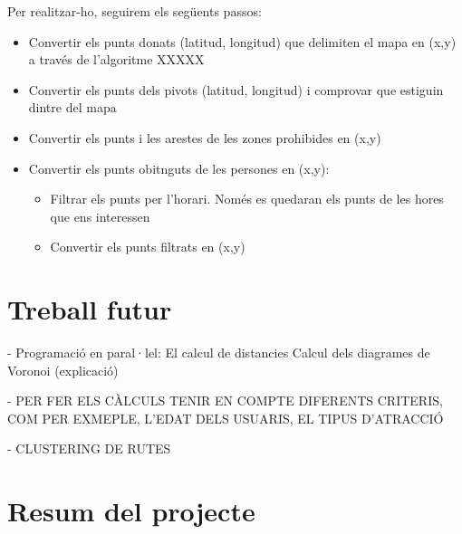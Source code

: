 \documentclass[12pt]{article}
\begin{document}
Per realitzar-ho, seguirem els següents passos:
\begin{itemize}
	\item Convertir els punts donats (latitud, longitud) que delimiten el mapa en (x,y) a través de l'algoritme XXXXX
	\item Convertir els punts dels pivots (latitud, longitud) i comprovar que estiguin dintre del mapa
	\item Convertir els punts i les arestes de les zones prohibides en (x,y)
	\item Convertir els punts obitnguts de les persones en (x,y):
	\begin{itemize}
		\item Filtrar els punts per l'horari. Només es quedaran els punts de les hores que ens interessen
		\item Convertir els punts filtrats en (x,y)
	\end{itemize}
	
\end{itemize}

\clearpage
\section{Treball futur}
- Programació en paral·lel:
	El calcul de distancies
	Calcul dels diagrames de Voronoi (explicació)

- PER FER ELS CÀLCULS TENIR EN COMPTE DIFERENTS CRITERIS, COM PER EXMEPLE, L'EDAT DELS USUARIS, EL TIPUS D'ATRACCIÓ

- CLUSTERING DE RUTES

\clearpage
\section{Resum del projecte}
\end{document}

